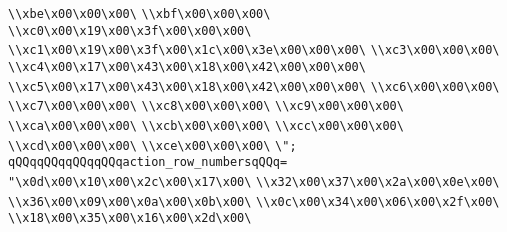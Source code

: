 \verb|\\xbe\x00\x00\x00\|\newline
\verb|\\xbf\x00\x00\x00\|\newline
\verb|\\xc0\x00\x19\x00\x3f\x00\x00\x00\|\newline
\verb|\\xc1\x00\x19\x00\x3f\x00\x1c\x00\x3e\x00\x00\x00\|\newline
\verb|\\xc3\x00\x00\x00\|\newline
\verb|\\xc4\x00\x17\x00\x43\x00\x18\x00\x42\x00\x00\x00\|\newline
\verb|\\xc5\x00\x17\x00\x43\x00\x18\x00\x42\x00\x00\x00\|\newline
\verb|\\xc6\x00\x00\x00\|\newline
\verb|\\xc7\x00\x00\x00\|\newline
\verb|\\xc8\x00\x00\x00\|\newline
\verb|\\xc9\x00\x00\x00\|\newline
\verb|\\xca\x00\x00\x00\|\newline
\verb|\\xcb\x00\x00\x00\|\newline
\verb|\\xcc\x00\x00\x00\|\newline
\verb|\\xcd\x00\x00\x00\|\newline
\verb|\\xce\x00\x00\x00\|\newline
\verb|\";|\newline
\verb|qQQqqQQqqQQqqQQqaction_row_numbersqQQq=|\newline
\verb|"\x0d\x00\x10\x00\x2c\x00\x17\x00\|\newline
\verb|\\x32\x00\x37\x00\x2a\x00\x0e\x00\|\newline
\verb|\\x36\x00\x09\x00\x0a\x00\x0b\x00\|\newline
\verb|\\x0c\x00\x34\x00\x06\x00\x2f\x00\|\newline
\verb|\\x18\x00\x35\x00\x16\x00\x2d\x00\|\newline
